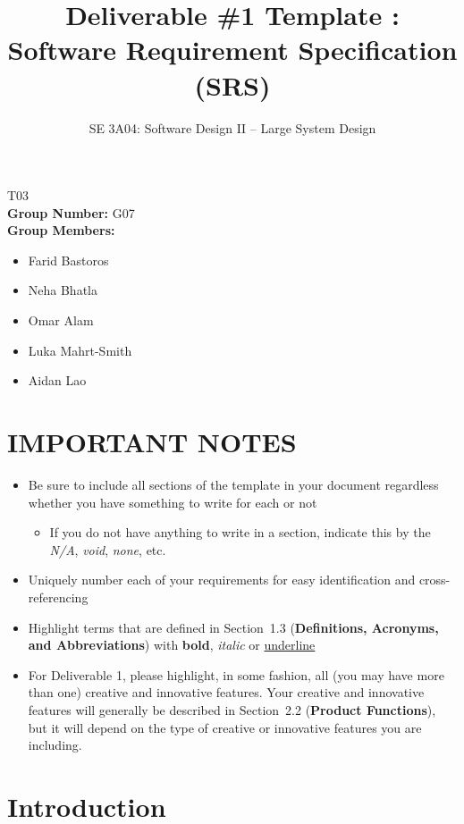 \documentclass[]{article}
\title{Deliverable \#1 Template : Software Requirement Specification (SRS)}
\author{SE 3A04: Software Design II -- Large System Design}
\date{}
\begin{document}
\setlength{\parskip}{3pt}

\maketitle	
{} T03\\
{\bf Group Number:} G07 \\
{\bf Group Members:} 
\begin{itemize}
	\item Farid Bastoros 
	\item Neha Bhatla
	\item Omar Alam
	\item Luka Mahrt-Smith
	\item Aidan Lao
\end{itemize}

\section*{IMPORTANT NOTES}
\begin{itemize}
	\item Be sure to include all sections of the template in your document regardless whether you have something to write for each or not
	\begin{itemize}
		\item If you do not have anything to write in a section, indicate this by the \emph{N/A}, \emph{void}, \emph{none}, etc.
	\end{itemize}
	\item Uniquely number each of your requirements for easy identification and cross-referencing
	\item Highlight terms that are defined in Section~1.3 (\textbf{Definitions, Acronyms, and Abbreviations}) with \textbf{bold}, \emph{italic} or \underline{underline}
	\item For Deliverable 1, please highlight, in some fashion, all (you may have more than one) creative and innovative features. Your creative and innovative features will generally be described in Section~2.2 (\textbf{Product Functions}), but it will depend on the type of creative or innovative features you are including.
\end{itemize}

\newpage
\section{Introduction}
\label{sec:introduction}
\end{document}
